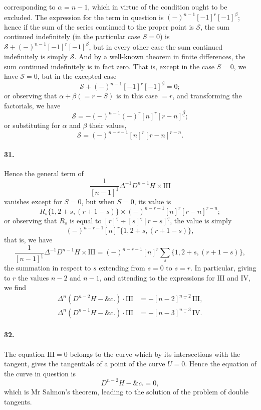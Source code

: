 \documentclass[12pt,a4paper]{article}
\theoremstyle{plain}
\begin{document}
corresponding  to  $\alpha = n - 1$,  which  in  virtue  of  the  condition  ought  to  be  excluded.  The  expression  for
the  term  in  question  is  $(-)^{n-1} [-1]^r [-1]^\beta$;  hence  if  the  sum  of  the  series  continued
to  the  proper  point  is  $\mathcal{S}$,  the  sum  continued  indefinitely  (in  the  particular  case  $S = 0$)
is  $\mathcal{S} + (-)^{n-1} [-1]^r [-1]^\beta$,  but  in  every  other  case  the  sum  continued  indefinitely  is
simply  $\mathcal{S}$.  And  by  a  well-known  theorem  in  finite  differences,  the  sum  continued
indefinitely  is  in  fact  zero.  That  is,  except  in  the  case  $S = 0$,  we  have  $\mathcal{S} = 0$,  but  in  the
excepted  case
\[
\mathcal{S} + (-)^{n-1} [-1]^r [-1]^\beta = 0;
\]
or  observing  that  $\alpha + \beta (= r - S)$  is  in  this  case  $= r$,  and  transforming  the  factorials,
we  have
\[
\mathcal{S} = -(-)^{n-1} (-)^{r} [n]^r [r-n]^{\underline{\beta}};
\]
or  substituting  for  $\alpha$  and  $\beta$  their  values,
\[
\mathcal{S} = (-)^{n-r-1} [n]^r [r-n]^{r-n}.
\]

\paragraph{31.}
Hence  the  general  term  of
\[
\frac{1}{[n-1]^{\underline{1}}} \Delta^{-1} D^{n-1} H \times \mathrm{III}
\]
vanishes  except  for  $S = 0$,  but  when  $S = 0$,  its  value  is
\[
R_s \{1, 2+s, (r+1-s)\} \times (-)^{n-r-1} [n]^r [r-n]^{r-n};
\]
or  observing  that  $R_s$  is  equal  to  $[r]^{\underline{s}} \div [s]^{\underline{s}} [r-s]^{\underline{s}}$,  the  value  is  simply
\[
(-)^{n-r-1} [n]^r \{1, 2+s, (r+1-s)\},
\]
that  is,  we  have
\[
\frac{1}{[n-1]^{\underline{1}}} \Delta^{-1} D^{n-1} H \times \mathrm{III}
= (-)^{n-r-1} [n]^r \sum_s \{1, 2+s, (r+1-s)\},
\]
the  summation   in  respect  to   $s$  extending  from   $s = 0$  to  $s = r$.      In  particular,   giving  to
$r$  the  values  $n-2$  and  $n-1$,  and  attending  to  the  expressions  for  $\mathrm{III}$  and  $\mathrm{IV}$,  we  find
\begin{align*}
\Delta^n (D^{n-2} H - \&c.) \cdot \mathrm{III} &= -[n-2]^{\underline{n-2}} \, \mathrm{III}, \\
\Delta^n (D^{n-1} H - \&c.) \cdot \mathrm{III} &= -[n-3]^{\underline{n-3}} \, \mathrm{IV}.
\end{align*}

\paragraph{32.}
The  equation  $\mathrm{III} = 0$  belongs  to  the  curve  which  by  its  intersections  with  the
tangent,  gives  the  tangentials  of  a  point  of  the  curve  $U = 0$.  Hence  the  equation  of
the  curve  in  question  is
\[
D^{n-2} H - \&c. = 0,
\]
which   is    Mr   Salmon's    theorem,   leading    to    the    solution    of    the    problem    of   double
tangents.
\end{document}
